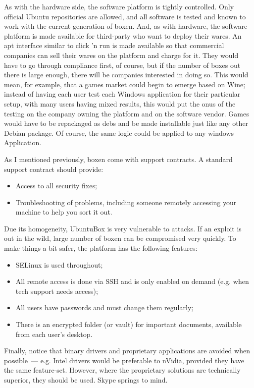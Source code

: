 \documentclass{book}
\begin{document}
As with the hardware side, the software platform is tightly
controlled. Only official Ubuntu repositories are allowed, and all
software is tested and known to work with the current generation of
boxen. And, as with hardware, the software platform is made available
for third-party who want to deploy their wares. An apt interface
similar to click 'n run is made available so that commercial companies
can sell their wares on the platform and charge for it. They would
have to go through compliance first, of course, but if the number of
boxes out there is large enough, there will be companies interested in
doing so. This would mean, for example, that a games market could
begin to emerge based on Wine; instead of having each user test each
Windows application for their particular setup, with many users having
mixed results, this would put the onus of the testing on the company
owning the platform and on the software vendor. Games would have to be
repackaged as debs and be made installable just like any other Debian
package. Of course, the same logic could be applied to any windows
Application.

As I mentioned previously, boxen come with support contracts. A
standard support contract should provide:

\begin{itemize}
\item Access to all security fixes;
\item Troubleshooting of problems, including someone remotely
  accessing your machine to help you sort it out.
\end{itemize}

Due its homogeneity, UbuntuBox is very vulnerable to attacks. If an
exploit is out in the wild, large number of boxen can be compromised
very quickly. To make things a bit safer, the platform has the
following features:

\begin{itemize}
\item SELinux is used throughout;
\item All remote access is done via SSH and is only enabled on demand
  (e.g. when tech support needs access);
\item All users have passwords and must change them regularly;
\item There is an encrypted folder (or vault) for important documents,
  available from each user's desktop.
\end{itemize}

Finally, notice that binary drivers and proprietary applications are
avoided when possible~--- e.g. Intel drivers would be preferable to
nVidia, provided they have the same feature-set. However, where the
proprietary solutions are technically superior, they should be
used. Skype springs to mind.
\end{document}
